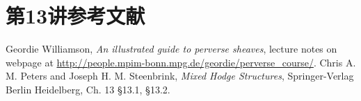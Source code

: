 \section{第13讲参考文献}\label{L13S4}
\begin{references}
 Geordie Williamson, \emph{An illustrated guide to perverse sheaves}, lecture notes on webpage at \url{http://people.mpim-bonn.mpg.de/geordie/perverse_course/}.
 Chris A. M. Peters and Joseph H. M. Steenbrink, \emph{Mixed Hodge Structures}, Springer-Verlag Berlin Heidelberg, Ch. 13 \S13.1, \S13.2.
\end{references}
